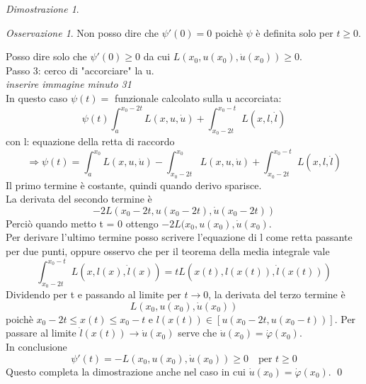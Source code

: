 \documentclass[a4paper]{book}
\theoremstyle{definition}
\theoremstyle{remark}
\newtheorem{oss}{Osservazione}
\newtheorem{dimst}{Dimostrazione}
\theoremstyle{definition}
\newcommand{\ra}{\Rightarrow}
\begin{document}
\begin{dimst}
\begin{oss}
Non posso dire che $\psi'(0)=0$ poichè $\psi$ è definita solo per $t \ge 0$.
\end{oss}
Posso dire solo che $\psi'(0)\ge0$ da cui $L(x_0, u(x_0), \dot{u}(x_0))\ge0$.\\
Passo 3: cerco di "accorciare" la u.\\
\textit{inserire immagine minuto 31}\\
In questo caso $\psi(t) = $ funzionale calcolato sulla u accorciata:
\[
	\psi(t) \int_{a}^{x_0 - 2t}L(x, u, \dot{u}) + \int_{x_0-2t}^{x_0-t}L(x, l, \dot{l})
\]
con l: equazione della retta di raccordo
\[
	\ra \psi(t) = \int_{a}^{x_0}L(x, u, \dot{u}) - \int_{x_0-2t}^{x_0}L(x, u, \dot{u}) +  \int_{x_0-2t}^{x_0-t}L(x, l, \dot{l})
\]
Il primo termine è costante, quindi quando derivo sparisce.\\
La derivata del secondo termine è 
\[
	-2L(x_0 - 2t, u(x_0-2t), \dot{u}(x_0-2t))
\]
Perciò quando metto t = 0 ottengo $-2 L(x_0, u(x_0), \dot{u}(x_0)$.\\
Per derivare l'ultimo termine posso scrivere l'equazione di l come retta passante per due punti, oppure osservo che per il teorema della media integrale vale 
\[
	\int_{x_0- 2t}^{x_0-t}L(x, l(x), \dot{l}(x)) = t L(x(t), l(x(t)), \dot{l}(x(t)))
\]
Dividendo per t e passando al limite per $t \to 0$, la derivata del terzo termine è
\[
	L(x_0, u(x_0), \dot{u}(x_0))
\]
poichè $x_0 -2t\le x(t)\le x_0-t$ e $l(x(t)) \in [u(x_0-2t, u(x_0-t))] $. Per passare al limite $\dot{l}(x(t)) \to \dot{u}(x_0)$ serve che $\dot{u}(x_0) = \dot{\varphi}(x_0)$.\\
In conclusione
\[
	\psi'(t) = -L(x_0, u(x_0), \dot{u}(x_0)) \ge 0\quad\text{per }t\ge0
\]
Questo completa la dimostrazione anche nel caso in cui $\dot{u}(x_0) = \dot{\varphi}(x_0)$. \qed
\end{dimst}
\end{document}
